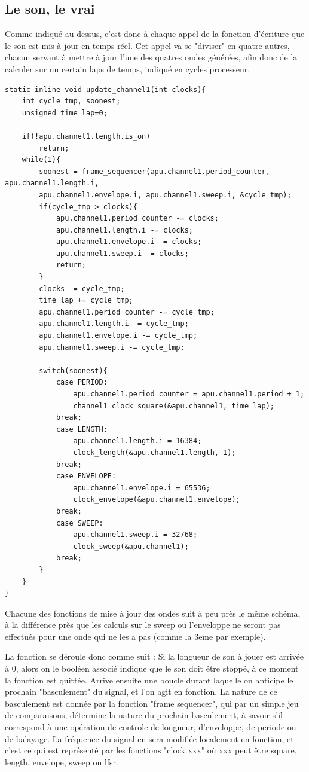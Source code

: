 \documentclass{report}
\begin{document}
\subsection{Le son, le vrai}
Comme indiqué au dessus, c'est donc à chaque appel de la fonction d'écriture que le son est mis à jour en temps réel.
Cet appel va se "diviser" en quatre autres, chacun servant à mettre à jour l'une des quatres ondes générées, afin donc de la calculer sur un certain laps de temps, indiqué en cycles processeur.

\begin{lstlisting}
static inline void update_channel1(int clocks){
	int cycle_tmp, soonest;
	unsigned time_lap=0;

	if(!apu.channel1.length.is_on)
		return;
	while(1){
		soonest = frame_sequencer(apu.channel1.period_counter, apu.channel1.length.i,
		apu.channel1.envelope.i, apu.channel1.sweep.i, &cycle_tmp);
		if(cycle_tmp > clocks){
			apu.channel1.period_counter -= clocks;
			apu.channel1.length.i -= clocks;
			apu.channel1.envelope.i -= clocks;
			apu.channel1.sweep.i -= clocks;
			return;
		}
		clocks -= cycle_tmp;
		time_lap += cycle_tmp;
		apu.channel1.period_counter -= cycle_tmp;
		apu.channel1.length.i -= cycle_tmp;
		apu.channel1.envelope.i -= cycle_tmp;
		apu.channel1.sweep.i -= cycle_tmp;
		
		switch(soonest){
			case PERIOD:
				apu.channel1.period_counter = apu.channel1.period + 1;
				channel1_clock_square(&apu.channel1, time_lap);
			break;
			case LENGTH:
				apu.channel1.length.i = 16384;
				clock_length(&apu.channel1.length, 1);
			break;
			case ENVELOPE:
				apu.channel1.envelope.i = 65536;
				clock_envelope(&apu.channel1.envelope);
			break;
			case SWEEP:
				apu.channel1.sweep.i = 32768;
				clock_sweep(&apu.channel1);
			break;
		}
	}
}
\end{lstlisting}

Chacune des fonctions de mise à jour des ondes suit à peu près le même schéma, à la différence près que les calculs sur le sweep ou l'enveloppe ne seront 
pas effectués pour une onde qui ne les a pas (comme la 3eme par exemple).

La fonction se déroule donc comme suit :
Si la longueur de son à jouer est arrivée à 0, alors on le booléen associé indique que le son doit être stoppé, à ce moment la fonction est quittée.
Arrive ensuite une boucle durant laquelle on anticipe le prochain "basculement" du signal, et l'on agit en fonction.
La nature de ce basculement est donnée par la fonction "frame sequencer", qui par un simple jeu de comparaisons, détermine la nature du prochain basculement, 
à savoir s'il correspond à une opération de controle de longueur, d'enveloppe, de periode ou de balayage.
La fréquence du signal en sera modifiée localement en fonction, et c'est ce qui est représenté par les fonctions "clock xxx" où xxx peut être square, length, envelope, sweep ou lfsr.
\end{document}

